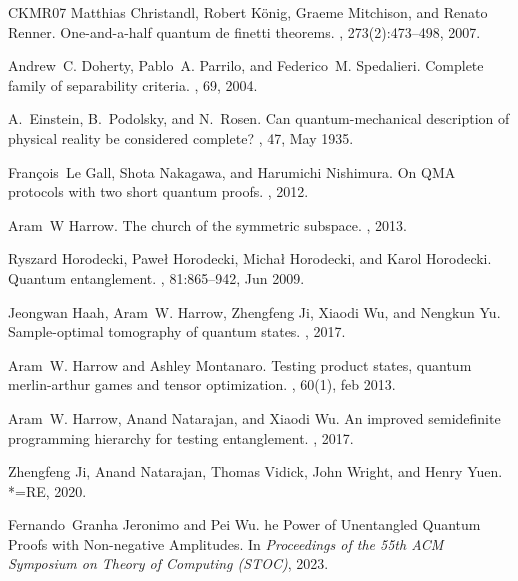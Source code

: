 \documentclass[10pt,a4paper]{article}
\theoremstyle{remark}
\newcommand{\1}[1]{\mathds{1}{[#1]}}
\numberwithin{equation}{section}
\begin{document}
\begin{thebibliography}{CKMR07}
Matthias Christandl, Robert K{\"o}nig, Graeme Mitchison, and Renato Renner.
\newblock One-and-a-half quantum de finetti theorems.
, 273(2):473--498, 2007.

Andrew~C. Doherty, Pablo~A. Parrilo, and Federico~M. Spedalieri.
\newblock Complete family of separability criteria.
, 69, 2004.

A.~Einstein, B.~Podolsky, and N.~Rosen.
\newblock Can quantum-mechanical description of physical reality be considered complete?
, 47, May 1935.

Fran\c{c}ois~Le Gall, Shota Nakagawa, and Harumichi Nishimura.
\newblock On {QMA} protocols with two short quantum proofs.
, 2012.

Aram~W Harrow.
\newblock The church of the symmetric subspace.
, 2013.

Ryszard Horodecki, Pawe\l{} Horodecki, Micha\l{} Horodecki, and Karol Horodecki.
\newblock Quantum entanglement.
, 81:865--942, Jun 2009.

Jeongwan Haah, Aram~W. Harrow, Zhengfeng Ji, Xiaodi Wu, and Nengkun Yu.
\newblock Sample-optimal tomography of quantum states.
, 2017.

Aram~W. Harrow and Ashley Montanaro.
\newblock Testing product states, quantum merlin-arthur games and tensor optimization.
, 60(1), feb 2013.

Aram~W. Harrow, Anand Natarajan, and Xiaodi Wu.
\newblock An improved semidefinite programming hierarchy for testing entanglement.
, 2017.

Zhengfeng Ji, Anand Natarajan, Thomas Vidick, John Wright, and Henry Yuen.
*={RE}, 2020.

Fernando~Granha Jeronimo and Pei Wu.
he {P}ower of {U}nentangled {Q}uantum {P}roofs with {N}on-negative {A}mplitudes.
\newblock In {\em Proceedings of the 55th ACM Symposium on Theory of Computing (STOC)}, 2023.


\end{thebibliography}
\end{document}
